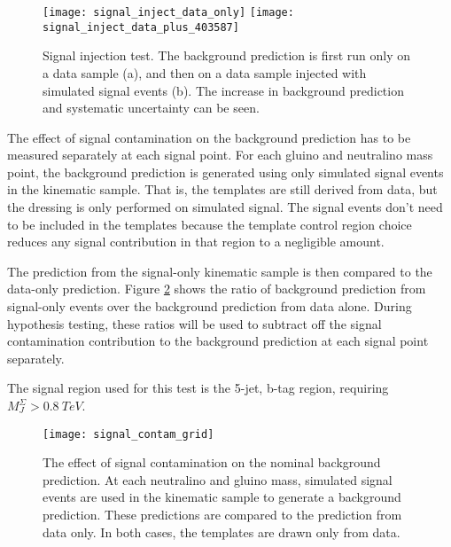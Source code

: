 \begin{figure}[h]
\texttt{[image: signal\_inject\_data\_only]}
\texttt{[image: signal\_inject\_data\_plus\_403587]}
\caption{Signal injection test. The background prediction is first run
only on a data sample (a), and then on a data sample injected with
simulated signal events (b). The increase in background prediction and
systematic uncertainty can be seen.}
\label{fig:signal_inject_403587}
\end{figure}

The effect of signal contamination on the background prediction has to
be measured separately at each signal point. For each gluino and
neutralino mass point, the background prediction is generated using
only simulated signal events in the kinematic sample. That is, the
templates are still derived from data, but the dressing is only
performed on simulated signal. The signal events don't need to be
included in the templates because the template control region choice
reduces any signal contribution in that region to a negligible amount.

The prediction from the signal-only
kinematic sample is then compared to the data-only prediction. Figure
\ref{fig:signal_contam_grid} shows the ratio of background prediction
from signal-only events over the background prediction from data
alone. During hypothesis testing, these ratios will be used to subtract
off the signal contamination contribution to the background prediction
at each signal point separately. 

The signal region used for this test is the 5-jet, b-tag region,
requiring $M_J^{\Sigma}>0.8~TeV$.

\begin{figure}[h]
\texttt{[image: signal\_contam\_grid]}
\caption{The effect of signal contamination on the nominal background
  prediction. At each neutralino and gluino mass, simulated signal
  events are used in the kinematic sample to generate a background
  prediction. These predictions are compared to the prediction from
  data only. In both cases, the templates are drawn only from
  data.}
\label{fig:signal_contam_grid}
\end{figure}